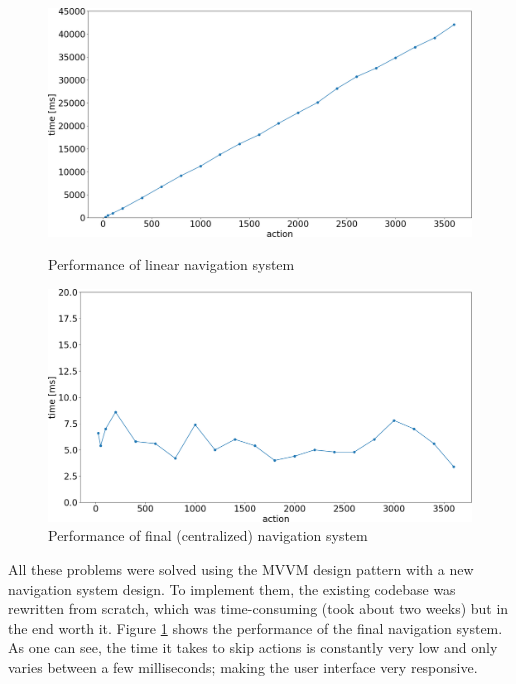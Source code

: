 \begin{figure}[!hbt]
\centering
\includegraphics[width=\textwidth]{figures/pyplot/performance_navsystem-linear.png}
\caption{Performance of linear navigation system}
\label{fig:navsystem.performance.linear}
\centering
\includegraphics[width=\textwidth]{figures/pyplot/performance_navsystem-central.png}
\caption{Performance of final (centralized) navigation system}
\label{fig:navsystem.performance.central}
\end{figure}

All these problems were solved using the MVVM design pattern with a new navigation system design. To implement them, the existing codebase was rewritten from scratch, which was time-consuming (took about two weeks) but in the end worth it. Figure \ref{fig:navsystem.performance.central} shows the performance of the final navigation system. As one can see, the time it takes to skip actions is constantly very low and only varies between a few milliseconds; making the user interface very responsive.

